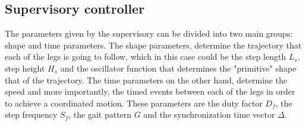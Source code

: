 \documentclass[main.tex]{subfiles}
\begin{document}
\subsection{Supervisory controller}
The parameters given by the supervisory can be divided into two main groups: shape and time parameters. The shape parameters, determine the trajectory that each of the legs is going to follow, which in this case could be the step length $L_s$, step height $H_s$ and the oscillator function that determines the "primitive" shape that of the trajectory. The time parameters on the other hand, determine the speed and more importantly, the timed events between each of the legs in order to achieve a coordinated motion. These parameters are the duty factor $D_f$, the step frequency $S_f$, the gait pattern $G$ and the synchronization time vector $\Delta$. 
\end{document}
